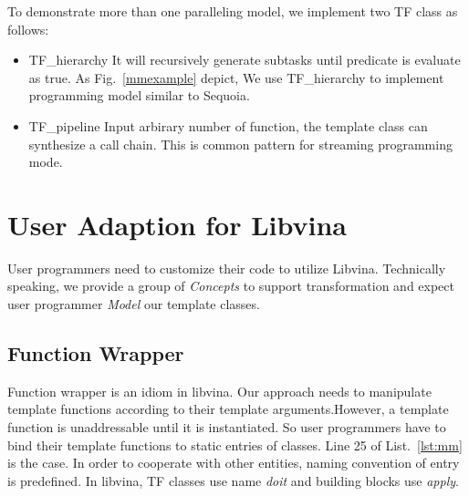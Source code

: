 To demonstrate more than one paralleling model, we implement two TF
class as follows:
\begin{itemize} 
\item TF\_hierarchy It will recursively generate subtasks until
  predicate is evaluate as true. As Fig.~\ref{mmexample} depict, We use
  TF\_hierarchy to implement programming model similar to Sequoia.

\item TF\_pipeline Input arbirary number of function, the template
  class can synthesize a call chain. This is common pattern for
  streaming programming mode.
\end{itemize} 

\section{User Adaption for Libvina}
User programmers need to customize their code to utilize
Libvina. Technically speaking, we provide a group of \emph{Concepts} to
support transformation and expect user
programmer \textit{Model} our template classes. 

\subsection{Function Wrapper}
Function wrapper is an idiom in libvina. Our approach needs to manipulate
template functions according to their template arguments.However, a
template function is unaddressable until it is instantiated. So user
programmers have to bind their template functions to static entries of
classes.  Line 25 of List.~\ref{lst:mm} is the case. In order to
cooperate with other entities, naming convention of entry is
predefined. In libvina, TF classes use name \textit{doit} and building
blocks use \textit{apply}. 

